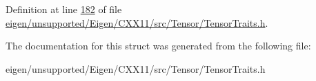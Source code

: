 Definition at line \hyperlink{eigen_2unsupported_2_eigen_2_c_x_x11_2src_2_tensor_2_tensor_traits_8h_source_l00182}{182} of file \hyperlink{eigen_2unsupported_2_eigen_2_c_x_x11_2src_2_tensor_2_tensor_traits_8h_source}{eigen/unsupported/\+Eigen/\+C\+X\+X11/src/\+Tensor/\+Tensor\+Traits.\+h}.



The documentation for this struct was generated from the following file\+:\begin{DoxyCompactItemize}
\item 
eigen/unsupported/\+Eigen/\+C\+X\+X11/src/\+Tensor/\+Tensor\+Traits.\+h\end{DoxyCompactItemize}

